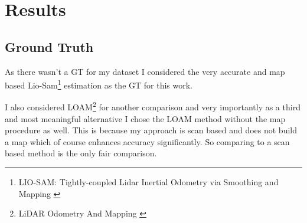 \chapter{Results}\label{sec:results}

\section{Ground Truth}{
    
    As there wasn't a GT for my dataset I considered the very accurate and map based Lio-Sam\footnote{LIO-SAM: Tightly-coupled Lidar Inertial Odometry via Smoothing and Mapping \citep{liosam2020shan}} estimation as the GT for this work. 
    
    I also considered LOAM\footnote{LiDAR Odometry And Mapping \citep{LOAM}} for another comparison and very importantly as a third and most meaningful alternative I chose the LOAM method without the map procedure as well. This is because my approach is scan based and does not build a map which of course enhances accuracy significantly. So comparing to a scan based method is the only fair comparison.


    }


